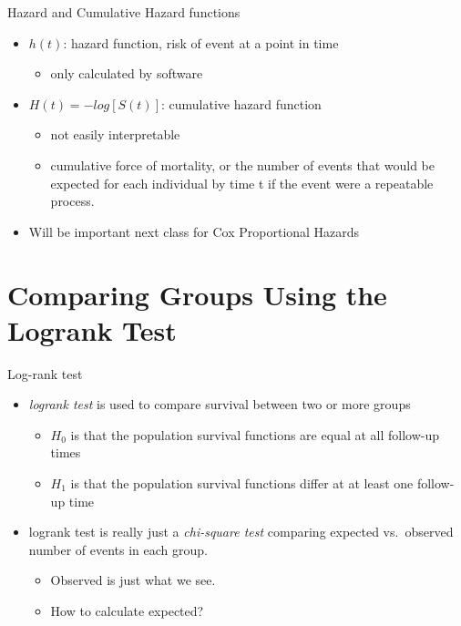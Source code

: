 \documentclass[
  ignorenonframetext,
]{beamer}
\providecommand{\tightlist}{%
  \setlength{\itemsep}{0pt}\setlength{\parskip}{0pt}}
\begin{document}
\begin{frame}{Hazard and Cumulative Hazard functions}
\protect\hypertarget{hazard-and-cumulative-hazard-functions}{}

\begin{itemize}
\tightlist
\item
  \(h(t)\): hazard function, risk of event at a point in time

  \begin{itemize}
  \tightlist
  \item
    only calculated by software
  \end{itemize}
\item
  \(H(t) = -log[S(t)]\): cumulative hazard function

  \begin{itemize}
  \tightlist
  \item
    not easily interpretable
  \item
    cumulative force of mortality, or the number of events that would be
    expected for each individual by time t if the event were a
    repeatable process.
  \end{itemize}
\item
  Will be important next class for Cox Proportional Hazards
\end{itemize}

\end{frame}

\hypertarget{comparing-groups-using-the-logrank-test}{%
\section{Comparing Groups Using the Logrank
Test}\label{comparing-groups-using-the-logrank-test}}

\begin{frame}{Log-rank test}
\protect\hypertarget{log-rank-test}{}

\begin{itemize}
\tightlist
\item
  \emph{logrank test} is used to compare survival between two or more
  groups

  \begin{itemize}
  \tightlist
  \item
    \(H_0\) is that the population survival functions are equal at all
    follow-up times
  \item
    \(H_1\) is that the population survival functions differ at at least
    one follow-up time
  \end{itemize}
\item
  logrank test is really just a \emph{chi-square test} comparing
  expected vs.~observed number of events in each group.

  \begin{itemize}
  \tightlist
  \item
    Observed is just what we see.
  \item
    How to calculate expected?
  \end{itemize}
\end{itemize}

\end{frame}
\end{document}
